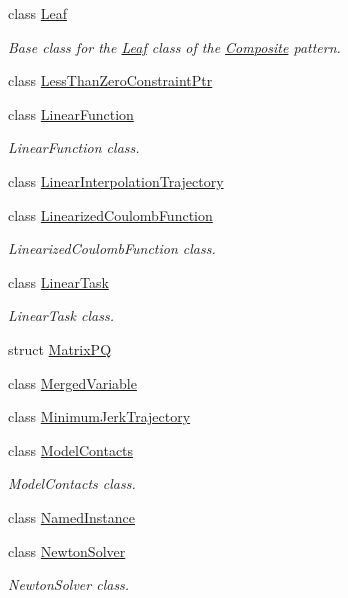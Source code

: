 \begin{DoxyCompactItemize}
class \hyperlink{classocra_1_1Leaf}{Leaf}
\begin{DoxyCompactList}\small\item\em Base class for the \hyperlink{classocra_1_1Leaf}{Leaf} class of the \hyperlink{classocra_1_1Composite}{Composite} pattern. \end{DoxyCompactList}\item 
class \hyperlink{classocra_1_1LessThanZeroConstraintPtr}{Less\+Than\+Zero\+Constraint\+Ptr}
\item 
class \hyperlink{classocra_1_1LinearFunction}{Linear\+Function}
\begin{DoxyCompactList}\small\item\em Linear\+Function class. \end{DoxyCompactList}\item 
class \hyperlink{classocra_1_1LinearInterpolationTrajectory}{Linear\+Interpolation\+Trajectory}
\item 
class \hyperlink{classocra_1_1LinearizedCoulombFunction}{Linearized\+Coulomb\+Function}
\begin{DoxyCompactList}\small\item\em Linearized\+Coulomb\+Function class. \end{DoxyCompactList}\item 
class \hyperlink{classocra_1_1LinearTask}{Linear\+Task}
\begin{DoxyCompactList}\small\item\em Linear\+Task class. \end{DoxyCompactList}\item 
struct \hyperlink{structocra_1_1MatrixPQ}{Matrix\+PQ}
\item 
class \hyperlink{classocra_1_1MergedVariable}{Merged\+Variable}
\item 
class \hyperlink{classocra_1_1MinimumJerkTrajectory}{Minimum\+Jerk\+Trajectory}
\item 
class \hyperlink{classocra_1_1ModelContacts}{Model\+Contacts}
\begin{DoxyCompactList}\small\item\em Model\+Contacts class. \end{DoxyCompactList}\item 
class \hyperlink{classocra_1_1NamedInstance}{Named\+Instance}
\item 
class \hyperlink{classocra_1_1NewtonSolver}{Newton\+Solver}
\begin{DoxyCompactList}\small\item\em Newton\+Solver class. \end{DoxyCompactList}\item 

\end{DoxyCompactItemize}
